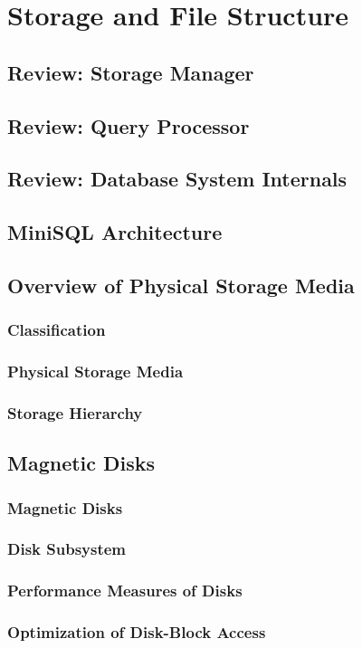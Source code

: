  \newpage
\section{Storage and File Structure}

\subsection*{Review: Storage Manager}

\subsection*{Review: Query Processor}

\subsection*{Review: Database System Internals}

\subsection*{MiniSQL Architecture}

\subsection{Overview of Physical Storage Media}

\subsubsection{Classification}

\subsubsection{Physical Storage Media}

\subsubsection{Storage Hierarchy}

\subsection{Magnetic Disks}


\subsubsection{Magnetic Disks}

\subsubsection{Disk Subsystem}

\subsubsection{Performance Measures of Disks}

\subsubsection{Optimization of Disk-Block Access}

